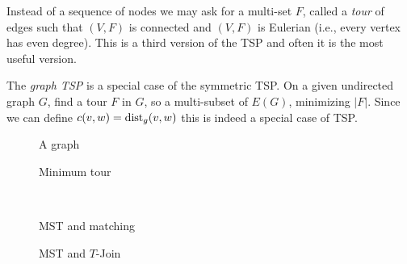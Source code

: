 \documentclass{skript}
\newcommand{\kant}{to node[at start, graph node]{}}
\begin{document}
\begin{definition}[Tour]
    Instead of a sequence of nodes we may ask for a multi-set $F$, called a \emph{tour} of edges such that $(V,F)$ is connected and $(V,F)$ is Eulerian (i.e., every vertex has even degree).
    This is a third version of the TSP and often it is the most useful version.
\end{definition}

\begin{definition}
    The \emph{graph TSP} is a special case of the symmetric TSP.
    On a given undirected graph $G$, find a tour $F$ in $G$, so a multi-subset of $E(G)$, minimizing $|F|$.
    Since we can define $c(v,w) = \operatorname{dist}_g(v,w)$ this is indeed a special case of TSP.
\end{definition}

\begin{figure}
    \centering
    \begin{minipage}[b][3.3cm]{.4\textwidth}
        \centering
    \vfill
    \caption{A graph}
    \end{minipage}\qquad
    \begin{minipage}[b][3.3cm]{.4\textwidth}
        \centering
    \vfill
    \caption{Minimum tour}
    \end{minipage}
    \ \vspace{10pt} 

    \begin{minipage}[b][3.3cm]{.4\textwidth}
        \centering
    \vfill
    \caption{MST and matching}
    \end{minipage}\qquad 
    \begin{minipage}[b][3.3cm]{.4\textwidth}
        \centering
    \vfill 
    \caption{MST and $T$-Join}
    \end{minipage}
\end{figure}
\end{document}
